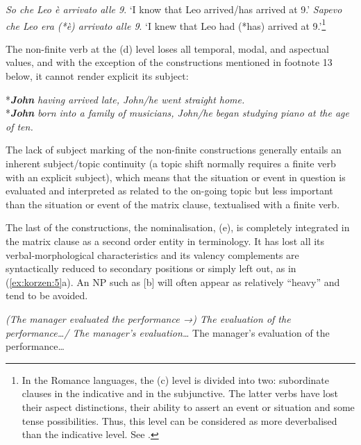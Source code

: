 \documentclass[output=paper]{LSP/langsci}
\begin{document}
\ea\label{ex:korzen:3}
   \ea
   \textit{So che Leo è arrivato alle 9}. `I know that Leo arrived/has arrived at 9.'
   \ex  
   \textit{Sapevo che Leo era (*è) arrivato alle 9}. `I knew that Leo had (*has) arrived at 9.'\footnote{In the Romance languages, the (c) level is divided into two: subordinate clauses in the indicative and in the subjunctive. The latter verbs have lost their aspect distinctions, their ability to assert an event or situation and some tense possibilities. Thus, this level can be considered as more deverbalised than the indicative level. See \citet{Korzen2007a,Korzen2009}.}
   \z
\z


\begin{styleTCiiiTextBodyFirstLineIndent}
The non-finite verb at the (d) level loses all temporal, modal, and aspectual values, and with the exception of the constructions mentioned in footnote 13 below, it cannot render explicit its subject:
\end{styleTCiiiTextBodyFirstLineIndent}

\newpage 
\ea\label{ex:korzen:4}
*\textbf{\textit{John}} \textit{having arrived late, John/he went straight home.}\\
*\textbf{\textit{John}} \textit{born into a family of musicians, John/he began studying piano at the age of ten.}
\z

The lack of subject marking of the non-finite constructions generally entails an inherent subject/topic continuity (a topic shift normally requires a finite verb with an explicit subject), which means that the situation or event in question is evaluated and interpreted as related to the on-going topic but less important than the situation or event of the matrix clause, textualised with a finite verb.

The last of the constructions, the nominalisation, (e), is completely integrated in the matrix clause as a second order entity in  terminology. It has lost all its verbal-morphological characteristics and its valency complements are syntactically reduced to secondary positions or simply left out, as in (\ref{ex:korzen:5}a). An NP such as [b] will often appear as relatively ``heavy'' and tend to be avoided. 

\ea\label{ex:korzen:5}
     \ea
     \textit{(The manager evaluated the performance →) The evaluation of the performance\ldots / The manager's evaluation\ldots}
      \ex 
      The manager's evaluation of the performance\ldots
      \z
\z
\end{document}
